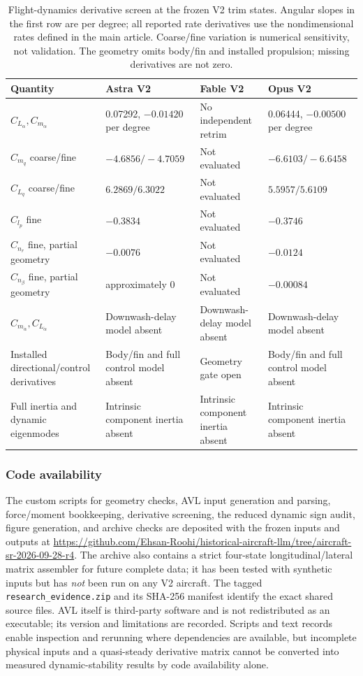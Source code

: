 \documentclass[10pt,letterpaper]{article}
\begin{document}
\begin{table}[H]\centering\footnotesize
\caption{Flight-dynamics derivative screen at the frozen V2 trim states. Angular slopes in the first row are per degree; all reported rate derivatives use the nondimensional rates defined in the main article. Coarse/fine variation is numerical sensitivity, not validation. The geometry omits body/fin and installed propulsion; missing derivatives are not zero.}\label{tab:derivativegate}
\begin{tabularx}{\linewidth}{lXXX}\toprule
Quantity & Astra V2 & Fable V2 & Opus V2\\\midrule
$C_{L_\alpha},C_{m_\alpha}$ & 0.07292, $-0.01420$ per degree & No independent retrim & 0.06444, $-0.00500$ per degree\\
$C_{m_q}$ coarse/fine & $-4.6856/-4.7059$ & Not evaluated & $-6.6103/-6.6458$\\
$C_{L_q}$ coarse/fine & $6.2869/6.3022$ & Not evaluated & $5.5957/5.6109$\\
$C_{l_p}$ fine & $-0.3834$ & Not evaluated & $-0.3746$\\
$C_{n_r}$ fine, partial geometry & $-0.0076$ & Not evaluated & $-0.0124$\\
$C_{n_\beta}$ fine, partial geometry & approximately 0 & Not evaluated & $-0.00084$\\
$C_{m_{\dot\alpha}},C_{L_{\dot\alpha}}$ & Downwash-delay model absent & Downwash-delay model absent & Downwash-delay model absent\\
Installed directional/control derivatives & Body/fin and full control model absent & Geometry gate open & Body/fin and full control model absent\\
Full inertia and dynamic eigenmodes & Intrinsic component inertia absent & Intrinsic component inertia absent & Intrinsic component inertia absent\\\bottomrule
\end{tabularx}
\end{table}

\subsubsection{Code availability}
The custom scripts for geometry checks, AVL input generation and parsing, force/moment bookkeeping, derivative screening, the reduced dynamic sign audit, figure generation, and archive checks are deposited with the frozen inputs and outputs at \url{https://github.com/Ehsan-Roohi/historical-aircraft-llm/tree/aircraft-sr-2026-09-28-r4}. The archive also contains a strict four-state longitudinal/lateral matrix assembler for future complete data; it has been tested with synthetic inputs but has \emph{not} been run on any V2 aircraft. The tagged \texttt{research\_evidence.zip} and its SHA-256 manifest identify the exact shared source files. AVL itself is third-party software and is not redistributed as an executable; its version and limitations are recorded. Scripts and text records enable inspection and rerunning where dependencies are available, but incomplete physical inputs and a quasi-steady derivative matrix cannot be converted into measured dynamic-stability results by code availability alone.
\end{document}
